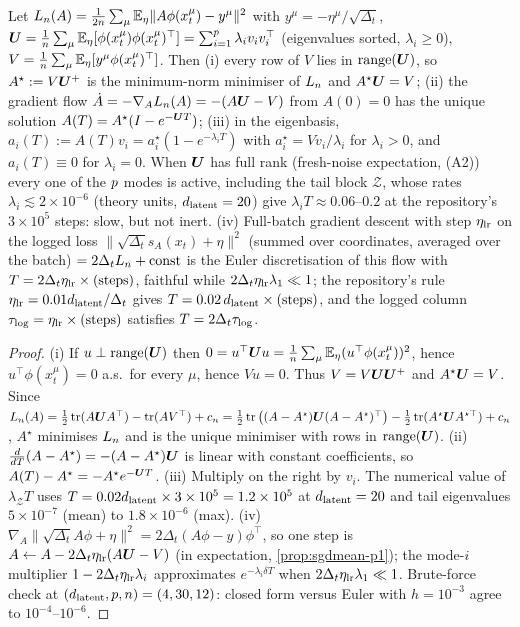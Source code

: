 \begin{lemma}\label{lem:gf-p1}
Let $L_{n}(A)=\tfrac1{2n}\sum_\mu\mathbb{E}_\eta\|A\phi(x^\mu_t)-y^\mu\|^2$ with $y^\mu=-\eta^\mu/\sqrt{\Delta_t}$, $\bm{U}=\tfrac1{n}\sum_\mu\mathbb{E}_\eta[\phi(x^\mu_t)\phi(x^\mu_t)^{\top}]=\sum_{i=1}^{p}\lambda_iv_iv_i^{\top}$ (eigenvalues sorted, $\lambda_i\ge0$), $V=\tfrac1{n}\sum_\mu\mathbb{E}_\eta[y^\mu\phi(x^\mu_t)^{\top}]$. Then (i) every row of $V$ lies in $\operatorname{range}(\bm{U})$, so $A^\star:=V\bm{U}^{+}$ is the minimum-norm minimiser of $L_{n}$ and $A^\star\bm{U}=V$; (ii) the gradient flow $\dot A=-\nabla_AL_{n}(A)=-(A\bm{U}-V)$ from $A(0)=0$ has the unique solution $A(T)=A^\star(I-e^{-\bm{U} T})$; (iii) in the eigenbasis, $a_i(T):=A(T)v_i=a_i^\star(1-e^{-\lambda_iT})$ with $a_i^\star=Vv_i/\lambda_i$ for $\lambda_i>0$, and $a_i(T)\equiv0$ for $\lambda_i=0$. When $\bm{U}$ has full rank (fresh-noise expectation, (A2)) every one of the $p$ modes is active, including the tail block $\mathcal Z$, whose rates $\lambda_i\lesssim2\times10^{-6}$ (theory units, $d_{\mathrm{latent}}=20$) give $\lambda_iT\approx0.06$--$0.2$ at the repository's $3\times10^5$ steps: slow, but not inert. (iv) Full-batch gradient descent with step $\eta_{\rm lr}$ on the logged loss $\|\sqrt{\Delta_t}s_A(x_t)+\eta\|^2$ (summed over coordinates, averaged over the batch) $=2\Delta_tL_{n}+{\rm const}$ is the Euler discretisation of this flow with $T=2\Delta_t\eta_{\rm lr}\times(\text{steps})$, faithful while $2\Delta_t\eta_{\rm lr}\lambda_1\ll1$; the repository's rule $\eta_{\rm lr}=0.01d_{\mathrm{latent}}/\Delta_t$ gives $T=0.02\,d_{\mathrm{latent}}\times(\text{steps})$, and the logged column $\tau_{\rm log}=\eta_{\rm lr}\times(\text{steps})$ satisfies $T=2\Delta_t\tau_{\rm log}$.
\end{lemma}
\begin{proof}
(i) If $u\perp\operatorname{range}(\bm{U})$ then $0=u^{\top}\bm{U} u=\tfrac1{n}\sum_\mu\mathbb{E}_\eta(u^{\top}\phi(x^\mu_t))^2$, hence $u^{\top}\phi(x^\mu_t)=0$ a.s.\ for every $\mu$, hence $Vu=0$. Thus $V=V\bm{U}\bm{U}^{+}$ and $A^\star\bm{U}=V$. Since $L_{n}(A)=\tfrac12\operatorname{tr}(A\bm{U} A^{\top})-\operatorname{tr}(AV^{\top})+c_{n}=\tfrac12\operatorname{tr}\big((A-A^\star)\bm{U}(A-A^\star)^{\top}\big)-\tfrac12\operatorname{tr}(A^\star\bm{U} A^{\star\top})+c_{n}$, $A^\star$ minimises $L_{n}$ and is the unique minimiser with rows in $\operatorname{range}(\bm{U})$. (ii) $\tfrac{d}{dT}(A-A^\star)=-(A-A^\star)\bm{U}$ is linear with constant coefficients, so $A(T)-A^\star=-A^\star e^{-\bm{U} T}$. (iii) Multiply on the right by $v_i$. The numerical value of $\lambda_{\mathcal Z}T$ uses $T=0.02d_{\mathrm{latent}}\times3\times10^5=1.2\times10^5$ at $d_{\mathrm{latent}}=20$ and tail eigenvalues $5\times10^{-7}$ (mean) to $1.8\times10^{-6}$ (max). (iv) $\nabla_A\|\sqrt{\Delta_t}A\phi+\eta\|^2=2\Delta_t(A\phi-y)\phi^{\top}$, so one step is $A\leftarrow A-2\Delta_t\eta_{\rm lr}(A\bm{U}-V)$ (in expectation, \cref{prop:sgdmean-p1}); the mode-$i$ multiplier $1-2\Delta_t\eta_{\rm lr}\lambda_i$ approximates $e^{-\lambda_i\delta T}$ when $2\Delta_t\eta_{\rm lr}\lambda_1\ll1$. Brute-force check at $(d_{\mathrm{latent}},p,n)=(4,30,12)$: closed form versus Euler with $h=10^{-3}$ agree to $10^{-4}$--$10^{-6}$.
\end{proof}

